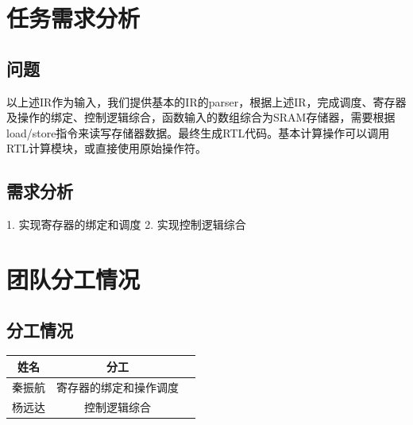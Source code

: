 \documentclass[12pt,hyperref,a4paper,UTF8]{ctexart}
\begin{document}
\cover

%
%

\thispagestyle{empty} %

\newpage
\tableofcontents

\newpage


\section{任务需求分析}   

\subsection{问题}

以上述IR作为输入，我们提供基本的IR的parser，根据上述IR，完成调度、寄存器及操作的绑定、控制逻辑综合，函数输入的数组综合为SRAM存储器，需要根据load/store指令来读写存储器数据。最终生成RTL代码。基本计算操作可以调用RTL计算模块，或直接使用原始操作符。

\subsection{需求分析}

1. 实现寄存器的绑定和调度
2. 实现控制逻辑综合

\section{团队分工情况}

\subsection{分工情况}

\begin{table}[h]
    \centering
    \begin{tabular}{|c|c|c|}
    \hline
    \textbf{姓名} & \textbf{分工} \\ \hline
    秦振航 & 寄存器的绑定和操作调度\\ \hline
    杨远达 & 控制逻辑综合 \\ \hline
    \end{tabular}
\end{table}
\end{document}
